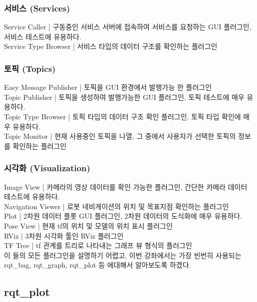 \subsubsection{서비스 (Services)}
Service Caller | 구동중인 서비스 서버에 접속하여 서비스를 요청하는 GUI 플러그인, 서비스 테스트에 유용하다.\\
Service Type Browser | 서비스 타입의 데이터 구조를 확인하는 플러그인\\
\subsubsection{토픽 (Topics)}
Easy Message Publisher | 토픽을 GUI 환경에서 발행가능 한 플러그인\\
Topic Publisher | 토픽을 생성하여 발행가능한 GUI 플러그인, 토픽 테스트에 매우 유용하다.\\
Topic Type Browser | 토픽 타입의 데이터 구조 확인 플러그인, 토픽 타입 확인에 매우 유용하다.\\
Topic Monitor | 현재 사용중인 토픽을 나열, 그 중에서 사용자가 선택한 토픽의 정보를 확인하는 플러그인\\
\subsubsection{시각화 (Visualization)}
Image View | 카메라의 영상 데이터를 확인 가능한 플러그인, 간단한 카메라 데이터 테스트에 유용하다.\\
Navigation Viewer | 로봇 네비게이션의 위치 및 목표지점 확인하는 플러그인\\
Plot | 2차원 데이터 플롯 GUI 플러그인, 2차원 데이터의 도식화에 매우 유용하다.\\
Pose View | 현재 tf의 위치 및 모델의 위치 표시 플러그인\\
RViz | 3차원 시각화 툴인 RViz 플러그인\\
TF Tree | tf 관계를 트리로 나타내는 그래프 뷰 형식의 플러그인\\

\vspace{\baselineskip}
\noindent
이 들의 모든 플러그인을 설명하기 어렵고, 이번 강좌에서는 가장 빈번히 사용되는 rqt\_bag, rqt\_graph, rqt\_plot 등 에대해서 알아보도록 하겠다.

\subsection{rqt\_plot}

